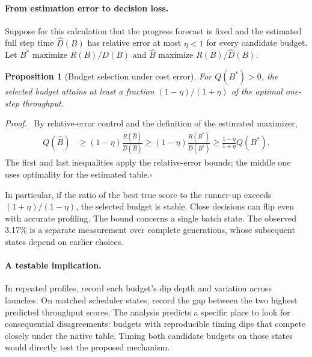 \documentclass[11pt]{article}
\newtheorem{proposition}{Proposition}
\newenvironment{proof}{\par\noindent\textit{Proof.}\ }{\unskip\nobreak\hfill$\square$\par}
\begin{document}
\paragraph{From estimation error to decision loss.} Suppose for this calculation that the progress forecast is fixed and the estimated full step time $\widehat D(B)$ has relative error at most $\eta<1$ for every candidate budget. Let $B^*$ maximize $R(B)/D(B)$ and $\widehat B$ maximize $R(B)/\widehat D(B)$. \begin{proposition}[Budget selection under cost error] For $Q(B^*)>0$, the selected budget attains at least a fraction $(1-\eta)/(1+\eta)$ of the optimal one-step throughput.\end{proposition}
\begin{proof} By relative-error control and the definition of the estimated maximizer,
\begin{align}
 Q(\widehat B)
 &\ge (1-\eta)\frac{R(\widehat B)}{\widehat D(\widehat B)}
 \ge (1-\eta)\frac{R(B^*)}{\widehat D(B^*)}
 \ge \frac{1-\eta}{1+\eta} Q(B^*).
\end{align}
The first and last inequalities apply the relative-error bounds; the middle one uses optimality for the estimated table.\end{proof} In particular, if the ratio of the best true score to the runner-up exceeds $(1+\eta)/(1-\eta)$, the selected budget is stable. Close decisions can flip even with accurate profiling. The bound concerns a single batch state. The observed 3.17\% is a separate measurement over complete generations, whose subsequent states depend on earlier choices.

\paragraph{A testable implication.} In repeated profiles, record each budget's dip depth and variation across launches. On matched scheduler states, record the gap between the two highest predicted throughput scores. The analysis predicts a specific place to look for consequential disagreements: budgets with reproducible timing dips that compete closely under the native table. Timing both candidate budgets on those states would directly test the proposed mechanism.
\clearpage
\end{document}
